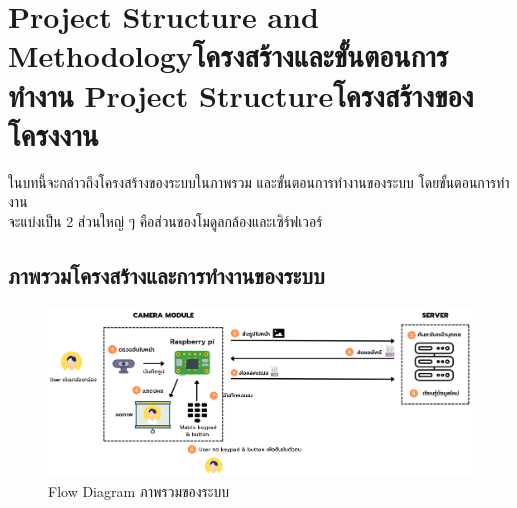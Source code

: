 \chapter{\ifproject%
\ifenglish Project Structure and Methodology\else โครงสร้างและขั้นตอนการทำงาน\fi
\else%
\ifenglish Project Structure\else โครงสร้างของโครงงาน\fi
\fi
}

ในบทนี้จะกล่าวถึงโครงสร้างของระบบในภาพรวม และขั้นตอนการทํางานของระบบ โดยขั้นตอนการทํางาน \\
จะแบ่งเป็น 2 ส่วนใหญ่ ๆ คือส่วนของโมดูลกล้องและเซิร์ฟเวอร์

\makeatletter


\makeatother

\section{ภาพรวมโครงสร้างและการทำงานของระบบ}


\begin{figure}[ht!]
  \begin{center}
    \includegraphics[scale=.5]{pic/overview.png}
  \caption[Flow Diagram ภาพรวมของระบบ]{Flow Diagram ภาพรวมของระบบ}
  \end{center}
  \label{fig:overview}
\end{figure}

